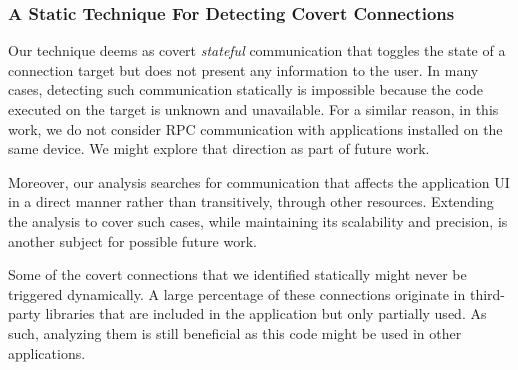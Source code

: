 \subsubsection{A Static Technique For Detecting Covert Connections}
Our technique deems 
%
as covert \emph{stateful} communication that toggles
the state of a connection target but does not present any information to the user. 
In many cases, detecting such
communication statically is impossible because the code executed on
the target is unknown and unavailable. 
For a similar reason, in this work, we do not consider RPC communication with applications
installed on the same device. We might explore that direction as part of future work. 

Moreover, our analysis searches for communication that affects the
application UI in a direct manner rather than transitively, through other resources. 
Extending the analysis to cover such cases, while maintaining its scalability and precision, 
is another subject for possible future work.
 
Some of the covert connections that we identified statically might never be triggered dynamically. 
A large percentage of these connections originate in  
third-party libraries that are included in the application but only partially used. 
As such, analyzing them is still beneficial as this code might be used in other applications.

